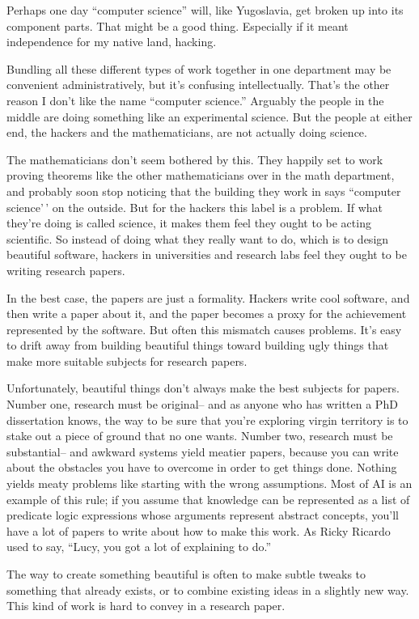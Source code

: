 Perhaps one day ``computer science'' will, like Yugoslavia, get broken
up into its component parts. That might be a good thing. Especially if
it meant independence for my native land, hacking.

Bundling all these different types of work together in one department
may be convenient administratively, but it's confusing intellectually.
That's the other reason I don't like the name ``computer science.''
Arguably the people in the middle are doing something like an
experimental science. But the people at either end, the hackers and the
mathematicians, are not actually doing science.

The mathematicians don't seem bothered by this. They happily set to work
proving theorems like the other mathematicians over in the math
department, and probably soon stop noticing that the building they work
in says ``computer science'\,' on the outside. But for the hackers this
label is a problem. If what they're doing is called science, it makes
them feel they ought to be acting scientific. So instead of doing what
they really want to do, which is to design beautiful software, hackers
in universities and research labs feel they ought to be writing research
papers.

In the best case, the papers are just a formality. Hackers write cool
software, and then write a paper about it, and the paper becomes a proxy
for the achievement represented by the software. But often this mismatch
causes problems. It's easy to drift away from building beautiful things
toward building ugly things that make more suitable subjects for
research papers.

Unfortunately, beautiful things don't always make the best subjects for
papers. Number one, research must be original-- and as anyone who has
written a PhD dissertation knows, the way to be sure that you're
exploring virgin territory is to stake out a piece of ground that no one
wants. Number two, research must be substantial-- and awkward systems
yield meatier papers, because you can write about the obstacles you have
to overcome in order to get things done. Nothing yields meaty problems
like starting with the wrong assumptions. Most of AI is an example of
this rule; if you assume that knowledge can be represented as a list of
predicate logic expressions whose arguments represent abstract concepts,
you'll have a lot of papers to write about how to make this work. As
Ricky Ricardo used to say, ``Lucy, you got a lot of explaining to do.''

The way to create something beautiful is often to make subtle tweaks to
something that already exists, or to combine existing ideas in a
slightly new way. This kind of work is hard to convey in a research
paper.

